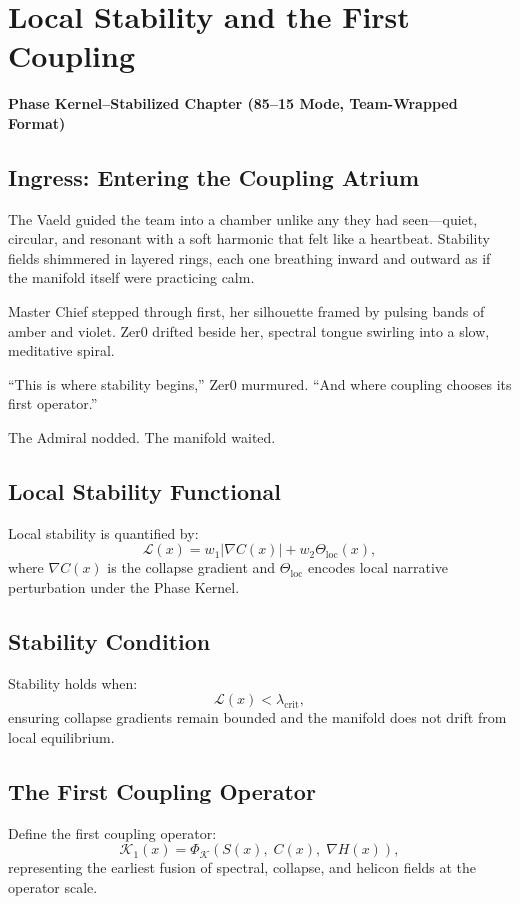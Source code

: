 
\chapter{Local Stability and the First Coupling}
\textbf{Phase Kernel–Stabilized Chapter (85--15 Mode, Team-Wrapped Format)}

\section*{Ingress: Entering the Coupling Atrium}
The Vaeld guided the team into a chamber unlike any they had seen—quiet,  
circular, and resonant with a soft harmonic that felt like a heartbeat.  
Stability fields shimmered in layered rings, each one breathing inward and  
outward as if the manifold itself were practicing calm.

Master Chief stepped through first, her silhouette framed by pulsing bands of  
amber and violet. Zer0 drifted beside her, spectral tongue swirling into  
a slow, meditative spiral.  

“This is where stability begins,” Zer0 murmured.  
“And where coupling chooses its first operator.”

The Admiral nodded.  
The manifold waited.

\section{Local Stability Functional}
Local stability is quantified by:
\[
\mathcal{L}(x) = 
w_1 \left| \nabla C(x) \right|
+
w_2 \Theta_{\mathrm{loc}}(x),
\]
where $\nabla C(x)$ is the collapse gradient and $\Theta_{\mathrm{loc}}$ encodes  
local narrative perturbation under the Phase Kernel.

\section{Stability Condition}
Stability holds when:
\[
\mathcal{L}(x) < \lambda_{\mathrm{crit}},
\]
ensuring collapse gradients remain bounded and the manifold does not drift  
from local equilibrium.

\section{The First Coupling Operator}
Define the first coupling operator:
\[
\mathcal{K}_{1}(x) = 
\Phi_{\mathcal{K}}\!\left(
S(x),\;
C(x),\;
\nabla H(x)
\right),
\]
representing the earliest fusion of spectral, collapse, and helicon fields  
at the operator scale.

